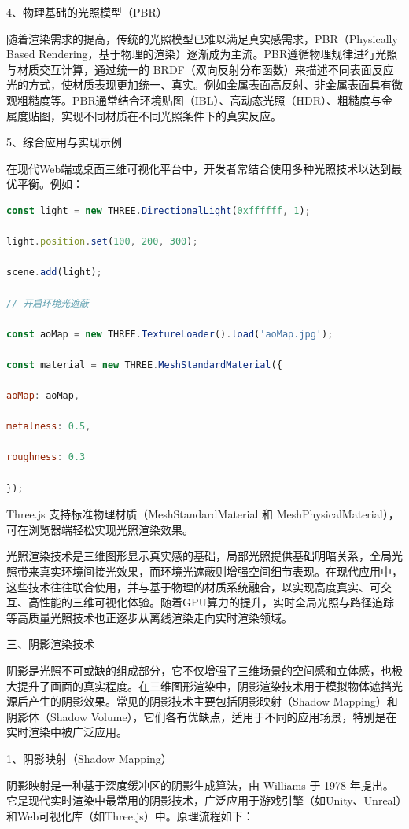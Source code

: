 4、物理基础的光照模型（PBR）

随着渲染需求的提高，传统的光照模型已难以满足真实感需求，PBR（Physically Based Rendering，基于物理的渲染）逐渐成为主流。PBR遵循物理规律进行光照与材质交互计算，通过统一的 BRDF（双向反射分布函数）来描述不同表面反应光的方式，使材质表现更加统一、真实。例如金属表面高反射、非金属表面具有微观粗糙度等。PBR通常结合环境贴图（IBL）、高动态光照（HDR）、粗糙度与金属度贴图，实现不同材质在不同光照条件下的真实反应。

5、综合应用与实现示例

在现代Web端或桌面三维可视化平台中，开发者常结合使用多种光照技术以达到最优平衡。例如：

\begin{lstlisting}[language=Javascript]
const light = new THREE.DirectionalLight(0xffffff, 1);

light.position.set(100, 200, 300);

scene.add(light);

// 开启环境光遮蔽

const aoMap = new THREE.TextureLoader().load('aoMap.jpg');

const material = new THREE.MeshStandardMaterial({

aoMap: aoMap,

metalness: 0.5,

roughness: 0.3

});
\end{lstlisting}

Three.js 支持标准物理材质（MeshStandardMaterial 和 MeshPhysicalMaterial），可在浏览器端轻松实现光照渲染效果。

光照渲染技术是三维图形显示真实感的基础，局部光照提供基础明暗关系，全局光照带来真实环境间接光效果，而环境光遮蔽则增强空间细节表现。在现代应用中，这些技术往往联合使用，并与基于物理的材质系统融合，以实现高度真实、可交互、高性能的三维可视化体验。随着GPU算力的提升，实时全局光照与路径追踪等高质量光照技术也正逐步从离线渲染走向实时渲染领域。

三、阴影渲染技术

阴影是光照不可或缺的组成部分，它不仅增强了三维场景的空间感和立体感，也极大提升了画面的真实程度。在三维图形渲染中，阴影渲染技术用于模拟物体遮挡光源后产生的阴影效果。常见的阴影技术主要包括阴影映射（Shadow Mapping）和阴影体（Shadow Volume），它们各有优缺点，适用于不同的应用场景，特别是在实时渲染中被广泛应用。

1、阴影映射（Shadow Mapping）

阴影映射是一种基于深度缓冲区的阴影生成算法，由 Williams 于 1978 年提出。它是现代实时渲染中最常用的阴影技术，广泛应用于游戏引擎（如Unity、Unreal）和Web可视化库（如Three.js）中。原理流程如下：

